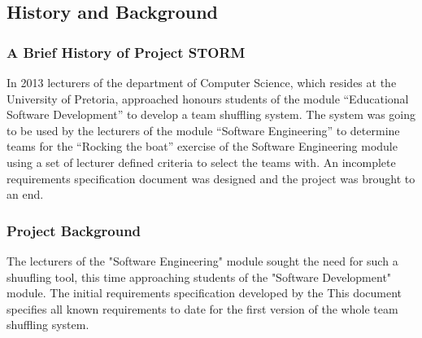 \subsection{History and Background}
\subsubsection{A Brief History of Project STORM}
In 2013 lecturers of the department of Computer Science, which resides at the University of Pretoria,
approached honours students of the module “Educational Software Development” to develop a team
shuffling system. 
The system was going to be used by the lecturers of the module “Software Engineering” to
determine teams for the “Rocking the boat” exercise of the Software Engineering module using a
set of lecturer ­defined criteria to select the teams with. An incomplete requirements specification document
was designed and the project was brought to an end. 

\subsubsection{Project Background}
The lecturers of the "Software Engineering" module sought the need for such a shuufling tool, this
time approaching students of the "Software Development" module. The initial requirements specification developed by the 
This document specifies all known requirements to date for the first version of the whole team
shuffling system.
